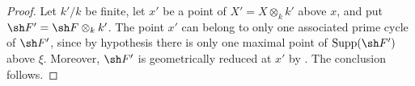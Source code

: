 \begin{proof}
Let $k'/k$ be finite, let $x'$ be a point of
$X'=X\otimes_k k'$ above $x$, and put
$\sh F'=\sh F\otimes_k k'$.
The point $x'$ can belong to only one associated prime cycle of
$\sh F'$, since by hypothesis there is only one maximal point of
$\operatorname{Supp}(\sh F')$ above $\xi$.
Moreover, $\sh F'$ is geometrically reduced at $x'$ by
.
The conclusion follows.
\end{proof}
